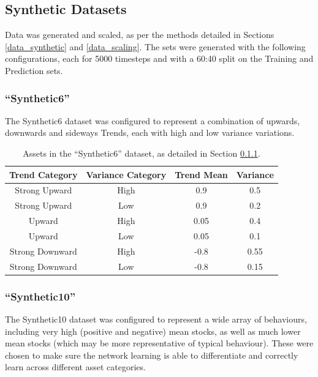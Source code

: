 \documentclass[a4paper,11pt,oneside]{article}
\theoremstyle{plain}
\theoremstyle{definition}
\begin{document}
	
	
	\subsection{Synthetic Datasets}
	
	Data was generated and scaled, as per the methods detailed in Sections \ref{data_synthetic} and \ref{data_scaling}. The sets were generated with the following configurations, each for 5000 timesteps and with a 60:40 split on the Training and Prediction sets.
	
	\subsubsection{``Synthetic6''} \label{dataset_synthetic6}
	
	The Synthetic6 dataset was configured to represent a combination of upwards, downwards and sideways Trends, each with high and low variance variations.
	
	\begin{table}[h]
		\centering
		\small
		\begin{tabular}{|c|c|c|c|}
			\hline
			\rowcolor{beaublue}			
			\textbf{Trend Category} &\textbf{Variance Category} & \textbf{Trend Mean} & \textbf{Variance}\\\hline	
			{Strong Upward} & {High} & {0.9} & {0.5} \\\hline
			{Strong Upward} & {Low} & {0.9} & {0.2} \\\hline
			{Upward} & {High} & {0.05} & {0.4} \\\hline
			{Upward} & {Low} & {0.05} & {0.1} \\\hline
			{Strong Downward} & {High} & {-0.8} & {0.55} \\\hline
			{Strong Downward} & {Low} & {-0.8} & {0.15} \\\hline
		\end{tabular}
		\newline\newline
		\caption{Assets in the ``Synthetic6'' dataset, as detailed in Section \ref{dataset_synthetic6}.}\label{tab_synth6}
	\end{table}
	
	\subsubsection{``Synthetic10''}\label{dataset_synthetic10}
	
	The Synthetic10 dataset was configured to represent a wide array of behaviours, including very high (positive and negative) mean stocks, as well as much lower mean stocks (which may be more representative of typical behaviour). These were chosen to make sure the network learning is able to differentiate and correctly learn across different asset categories.
	
\end{document}
